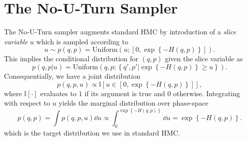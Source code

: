 \section{The No-U-Turn Sampler}
The No-U-Turn sampler augments standard HMC by introduction of a \textit{slice variable} $u$ which is sampled according to
\begin{equation}
    u \sim p(q, p) = \text{Uniform}\left(u; \left[0, \exp\left\{-H(q, p)\right\}\right]\right).
\end{equation} 
This implies the conditional distribution for $(q, p)$ given the slice variable as
\begin{equation}
    p(q, p|u) = \text{Uniform}\left( q, p; \left\{q', p' \bigg| \exp\left\{-H(q, p)\right\} \geq u \right\} \right).
\end{equation}
Consequentially, we have a joint distribution 
\begin{equation}
    p(q, p, u) \propto \mathbb{I}\left[u \in \left[0, \exp\left\{-H(q, p)\right\}\right]\right],
\end{equation}
where $\mathbb{I}[\cdot]$ evaluates to $1$ if its argument is true and $0$ otherwise. 
Integrating with respect to $u$ yields the marginal distribution
over phase-space
\begin{equation}
    p(q, p) = \int p(q, p, u) \dd u \propto \int_0^{\exp\left\{-H(q, p)\right\}}\dd u = \exp\left\{-H(q, p)\right\}.
\end{equation}
which is the target distribution we use in standard HMC.

